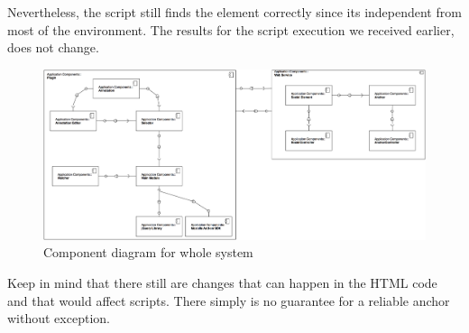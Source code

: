Nevertheless, the script still finds the element correctly since its independent from most of the environment. The results for the script execution we received earlier, does not change. 

\begin{figure}\centering
	\includegraphics[width=13cm]{images/component-wholesystem-diagram.png}
	\caption{Component diagram for whole system}
	\label{component-wholesystem-diagram}
\end{figure}

Keep in mind that there still are changes that can happen in the HTML code and that would affect scripts. There simply is no guarantee for a reliable anchor without exception.

\newpage
